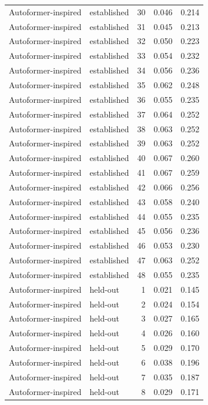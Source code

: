 \begin{tabular}{llrrr}
Autoformer-inspired & established & 30 & 0.046 & 0.214 \\
Autoformer-inspired & established & 31 & 0.045 & 0.213 \\
Autoformer-inspired & established & 32 & 0.050 & 0.223 \\
Autoformer-inspired & established & 33 & 0.054 & 0.232 \\
Autoformer-inspired & established & 34 & 0.056 & 0.236 \\
Autoformer-inspired & established & 35 & 0.062 & 0.248 \\
Autoformer-inspired & established & 36 & 0.055 & 0.235 \\
Autoformer-inspired & established & 37 & 0.064 & 0.252 \\
Autoformer-inspired & established & 38 & 0.063 & 0.252 \\
Autoformer-inspired & established & 39 & 0.063 & 0.252 \\
Autoformer-inspired & established & 40 & 0.067 & 0.260 \\
Autoformer-inspired & established & 41 & 0.067 & 0.259 \\
Autoformer-inspired & established & 42 & 0.066 & 0.256 \\
Autoformer-inspired & established & 43 & 0.058 & 0.240 \\
Autoformer-inspired & established & 44 & 0.055 & 0.235 \\
Autoformer-inspired & established & 45 & 0.056 & 0.236 \\
Autoformer-inspired & established & 46 & 0.053 & 0.230 \\
Autoformer-inspired & established & 47 & 0.063 & 0.252 \\
Autoformer-inspired & established & 48 & 0.055 & 0.235 \\
Autoformer-inspired & held-out & 1 & 0.021 & 0.145 \\
Autoformer-inspired & held-out & 2 & 0.024 & 0.154 \\
Autoformer-inspired & held-out & 3 & 0.027 & 0.165 \\
Autoformer-inspired & held-out & 4 & 0.026 & 0.160 \\
Autoformer-inspired & held-out & 5 & 0.029 & 0.170 \\
Autoformer-inspired & held-out & 6 & 0.038 & 0.196 \\
Autoformer-inspired & held-out & 7 & 0.035 & 0.187 \\
Autoformer-inspired & held-out & 8 & 0.029 & 0.171 \\

\end{tabular}
